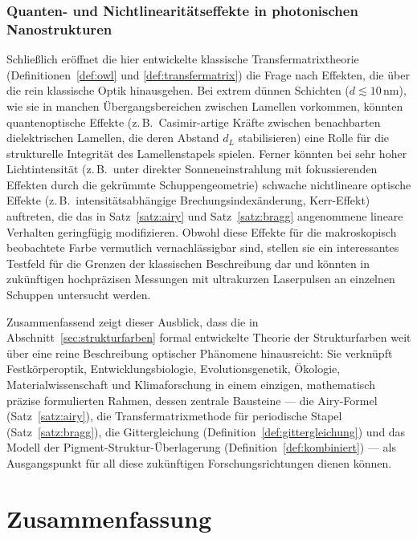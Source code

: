 ﻿\documentclass[a4paper,12pt]{article}
\theoremstyle{definition}
\begin{document}
	\subsubsection{Quanten- und Nichtlinearitätseffekte in photonischen Nanostrukturen}

	Schließlich eröffnet die hier entwickelte klassische
	Transfermatrixtheorie (Definitionen~\ref{def:owl} und
	\ref{def:transfermatrix}) die Frage nach Effekten, die über die
	rein klassische Optik hinausgehen. Bei extrem dünnen Schichten
	($d \lesssim 10$\,nm), wie sie in manchen
	Übergangsbereichen zwischen Lamellen vorkommen, könnten
	quantenoptische Effekte (z.\,B.\ Casimir-artige Kräfte zwischen
	benachbarten dielektrischen Lamellen, die deren Abstand $d_L$
	stabilisieren) eine Rolle für die strukturelle Integrität des
	Lamellenstapels spielen. Ferner könnten bei sehr hoher
	Lichtintensität (z.\,B.\ unter direkter Sonneneinstrahlung mit
	fokussierenden Effekten durch die gekrümmte Schuppengeometrie)
	schwache nichtlineare optische Effekte (z.\,B.\
	intensitätsabhängige Brechungsindexänderung, Kerr-Effekt)
	auftreten, die das in Satz~\ref{satz:airy} und
	Satz~\ref{satz:bragg} angenommene lineare Verhalten geringfügig
	modifizieren. Obwohl diese Effekte für die makroskopisch
	beobachtete Farbe vermutlich vernachlässigbar sind, stellen sie ein
	interessantes Testfeld für die Grenzen der klassischen
	Beschreibung dar und könnten in zukünftigen
	hochpräzisen Messungen mit ultrakurzen Laserpulsen an einzelnen
	Schuppen untersucht werden.

	Zusammenfassend zeigt dieser Ausblick, dass die in
	Abschnitt~\ref{sec:strukturfarben} formal entwickelte Theorie der
	Strukturfarben weit über eine reine Beschreibung optischer
	Phänomene hinausreicht: Sie verknüpft Festkörperoptik,
	Entwicklungsbiologie, Evolutionsgenetik, Ökologie, Materialwissenschaft
	und Klimaforschung in einem einzigen, mathematisch präzise
	formulierten Rahmen, dessen zentrale Bausteine --- die Airy-Formel
	(Satz~\ref{satz:airy}), die Transfermatrixmethode für periodische
	Stapel (Satz~\ref{satz:bragg}), die Gittergleichung
	(Definition~\ref{def:gittergleichung}) und das Modell der
	Pigment-Struktur-Überlagerung (Definition~\ref{def:kombiniert})
	--- als Ausgangspunkt für all diese zukünftigen Forschungsrichtungen
	dienen können.


	\section{Zusammenfassung}
	
\end{document}
